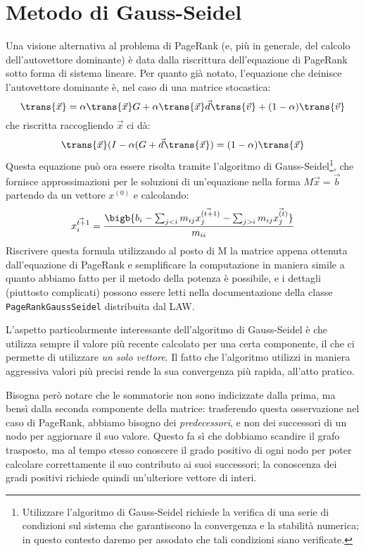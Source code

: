 \section{Metodo di Gauss-Seidel}
Una visione alternativa al problema di PageRank (e, più in generale, del calcolo dell'autovettore dominante) è data dalla riscrittura dell'equazione di PageRank sotto forma di sistema lineare. Per quanto già notato, l'equazione che deinisce l'autovettore dominante è, nel caso di una matrice stocastica:
\begin{equation}
	\trans{\vec{x}} = \alpha\trans{\vec{x}}G + \alpha\trans{\vec{x}}\vec{d}\trans{\vec{v}} + (1 - \alpha)\trans{\vec{v}}
\end{equation}
che riscritta raccogliendo $\vec{x}$ ci dà:
\begin{equation}
	\trans{\vec{x}}(I - \alpha(G + \vec{d}\trans{\vec{x}}) = (1 - \alpha)\trans{\vec{x}}
\end{equation}
Questa equazione può ora essere risolta tramite l'algoritmo di Gauss-Seidel\footnote{Utilizzare l'algoritmo di Gauss-Seidel richiede la verifica di una serie di condizioni sul sistema che garantiscono la convergenza e la stabilità numerica; in questo contesto daremo per assodato che tali condizioni siano verificate.}, che fornisce approssimazioni per le soluzioni di un'equazione nella forma $M\vec{x} = \vec{b}$ partendo da un vettore $x^{(0)}$ e calcolando:
\begin{equation}
	\vec{x_i^{t + 1}} = \frac{\bigb{b_i - \sum_{j < i}m_{ij}\vec{x_j^{(t + 1)}} - \sum_{j > i}m_{ij}\vec{x_j^{(t)}}}}{m_{ii}}
\end{equation}
Riscrivere questa formula utilizzando al posto di M la matrice appena ottenuta dall'equazione di PageRank e semplificare la computazione in maniera simile a quanto abbiamo fatto per il metodo della potenza è possibile, e i dettagli (piuttosto complicati) possono essere letti nella documentazione della classe \texttt{PageRankGaussSeidel} distribuita dal LAW.

L'aspetto particolarmente interessante dell'algoritmo di Gauss-Seidel è che utilizza sempre il valore più recente calcolato per una certa componente, il che ci permette di utilizzare \textit{un solo vettore}. Il fatto che l'algoritmo utilizzi in maniera aggressiva valori più precisi rende la sua convergenza più rapida, all'atto pratico.

Bisogna però notare che le sommatorie non sono indicizzate dalla prima, ma bensì dalla seconda componente della matrice: trasferendo questa osservazione nel caso di PageRank, abbiamo bisogno dei \textit{predecessori}, e non dei successori di un nodo per aggiornare il suo valore. Questo fa sì che dobbiamo scandire il grafo trasposto, ma al tempo stesso conoscere il grado positivo di ogni nodo per poter calcolare correttamente il suo contributo ai suoi successori; la conoscenza dei gradi positivi richiede quindi un'ulteriore vettore di interi.
